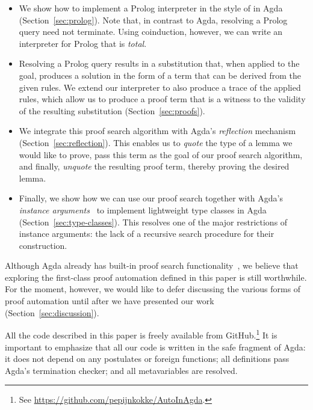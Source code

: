\begin{itemize}
\item %
  We show how to implement a Prolog interpreter in the style of
  \citet{stutterheim} in Agda (Section~\ref{sec:prolog}). Note that,
  in contrast to Agda, resolving a Prolog query need not terminate.
  Using coinduction, however, we can write an interpreter for Prolog
  that is \emph{total}.
\item %
  Resolving a Prolog query results in a substitution that, when applied
  to the goal, produces a solution in the form of a term that can be
  derived from the given rules.
  We extend our interpreter to also produce a trace of the applied
  rules, which allow us to produce a proof term that is a witness to
  the validity of the resulting substitution (Section~\ref{sec:proofs}).
\item %
  We integrate this proof search algorithm with Agda's
  \emph{reflection} mechanism (Section~\ref{sec:reflection}). This
  enables us to \emph{quote} the type of a lemma we would like to
  prove, pass this term as the goal of our proof search algorithm, and
  finally, \emph{unquote} the resulting proof term, thereby proving
  the desired lemma.
\item %
  Finally, we show how we can use our proof search together with
  Agda's \emph{instance arguments}~\cite{instance-args} to implement
  lightweight type classes in Agda (Section~\ref{sec:type-classes}).
  This resolves one of the major restrictions of instance arguments:
  the lack of a recursive search procedure for their construction.
\end{itemize}

Although Agda already has built-in proof search
functionality~\cite{lindblad}, we believe that exploring the
first-class proof automation defined in this paper is still
worthwhile. For the moment, however, we would like to defer discussing
the various forms of proof automation until after we have
presented our work (Section~\ref{sec:discussion}).

All the code described in this paper is freely available from
GitHub.\footnote{
  See \url{https://github.com/pepijnkokke/AutoInAgda}.
} It is important to emphasize that all our code
is written in the safe fragment of Agda: it does not depend on any
postulates or foreign functions; all definitions pass Agda's
termination checker; and all metavariables are resolved.

